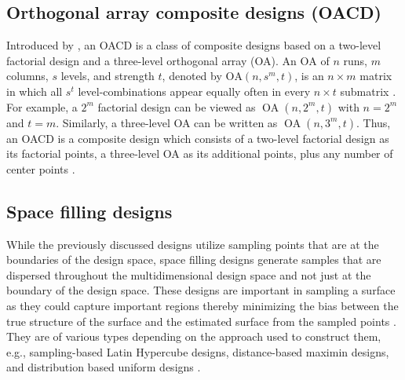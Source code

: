 \documentclass [PhD] {package/uclathes}
\begin{document}
\subsection*{Orthogonal array composite designs (OACD)}
Introduced by \textcite{xu2014combining}, an OACD is a class of composite designs based on a two-level factorial design and a three-level {orthogonal array (OA)}. An $\mathrm{OA}$ of $n$ runs, $m$ columns, $s$ levels, and strength $t$, denoted by $\mathrm{OA}\left(n, s^m, t\right)$, is an $n \times m$ matrix in which all $s^t$ level-combinations appear equally often in every $n \times t$ submatrix \parencite{wu2011experiments}. For example, a $2^m$ factorial design can be viewed as $\operatorname{OA}\left(n, 2^m, t\right)$ with $n=2^m$ and $t=m$. Similarly, a three-level OA can be written as $\operatorname{OA}\left(n, 3^m, t\right)$. Thus, an OACD is a composite design which consists of a two-level factorial design as its factorial points, a three-level OA as its additional points, plus any number of center points \parencite{luna2022orthogonal}.

\subsection*{Space filling designs}
While the previously discussed designs  utilize sampling points that are at the boundaries of the design space, space filling designs generate samples that are dispersed throughout the multidimensional design space and not just at the boundary of the design space. These designs are important in sampling a surface as they could capture important regions thereby minimizing the bias between the true structure of the surface and the estimated surface from the sampled points \parencite{gardner2006small, giunta2003overview}. They are of various types depending on the approach used to construct them, e.g., sampling-based  Latin Hypercube designs, distance-based  maximin designs, and distribution based uniform designs \parencite{burton2022design}.
\end{document}
